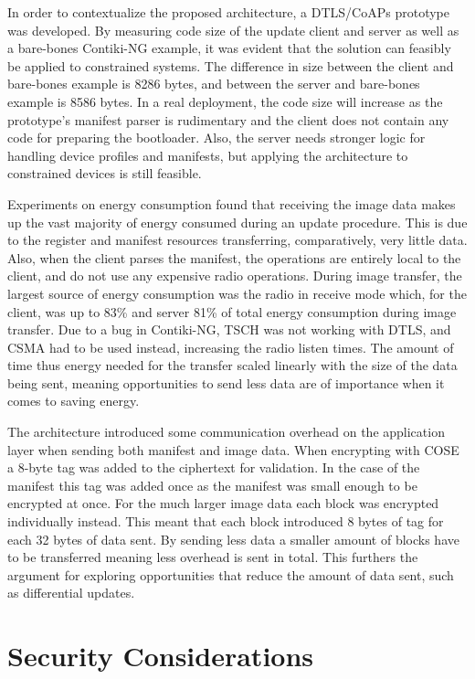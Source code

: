 \documentclass[0-thesis.tex]{subfiles}
\begin{document}
In order to contextualize the proposed architecture, a DTLS/CoAPs prototype was developed.
By measuring code size of the update client and server as well as a bare-bones Contiki-NG
example, it was evident that the solution can feasibly be applied to constrained systems.
The difference in size between the client and bare-bones example is 8286 bytes, and
between the server and bare-bones example is 8586 bytes. In a real deployment, the code
size will increase as the prototype's manifest parser is rudimentary and the client does
not contain any code for preparing the bootloader. Also, the server needs stronger logic
for handling device profiles and manifests, but applying the architecture to constrained
devices is still feasible.

Experiments on energy consumption found that receiving the image data makes up the vast
majority of energy consumed during an update procedure. This is due to the register and
manifest resources transferring, comparatively, very little data. Also, when the client
parses the manifest, the operations are entirely local to the client, and do not use any
expensive radio operations. During image transfer, the largest source of energy
consumption was the radio in receive mode which, for the client, was up to 83\% and server
81\% of total energy consumption during image transfer. Due to a bug in Contiki-NG, TSCH
was not working with DTLS, and CSMA had to be used instead, increasing the radio listen
times. The amount of time thus energy needed for the transfer scaled linearly with the
size of the data being sent, meaning opportunities to send less data are of importance
when it comes to saving energy.

The architecture introduced some communication overhead on the application layer when
sending both manifest and image data. When encrypting with COSE a 8-byte tag was added to
the ciphertext for validation. In the case of the manifest this tag was added once as the
manifest was small enough to be encrypted at once. For the much larger image data each
block was encrypted individually instead. This meant that each block introduced 8 bytes of
tag for each 32 bytes of data sent. By sending less data a smaller amount of blocks have
to be transferred meaning less overhead is sent in total. This furthers the argument for
exploring opportunities that reduce the amount of data sent, such as differential updates.

\section{Security Considerations}
\label{sec:security-considerations}
\end{document}
